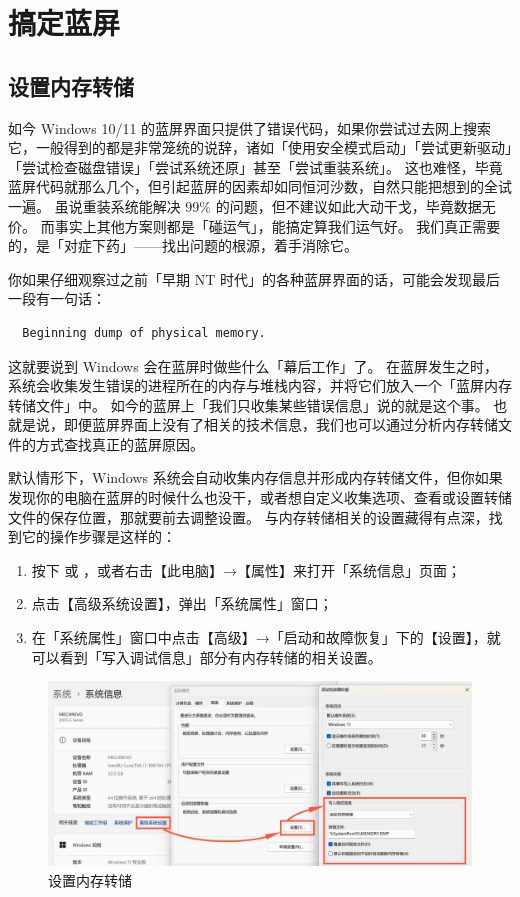 \section{搞定蓝屏}

\subsection{设置内存转储}

如今 Windows 10/11 的蓝屏界面只提供了错误代码，如果你尝试过去网上搜索它，一般得到的都是非常笼统的说辞，诸如「使用安全模式启动」「尝试更新驱动」「尝试检查磁盘错误」「尝试系统还原」甚至「尝试重装系统」。
这也难怪，毕竟蓝屏代码就那么几个，但引起蓝屏的因素却如同恒河沙数，自然只能把想到的全试一遍。
虽说重装系统能解决 99\% 的问题，但不建议如此大动干戈，毕竟数据无价。
而事实上其他方案则都是「碰运气」，能搞定算我们运气好。
我们真正需要的，是「对症下药」——找出问题的根源，着手消除它。

你如果仔细观察过之前「早期 NT 时代」的各种蓝屏界面的话，可能会发现最后一段有一句话：

\begin{Verbatim}
  Beginning dump of physical memory.
\end{Verbatim}

这就要说到 Windows 会在蓝屏时做些什么「幕后工作」了。
在蓝屏发生之时，系统会收集发生错误的进程所在的内存与堆栈内容，并将它们放入一个「蓝屏内存转储文件」中。
如今的蓝屏上「我们只收集某些错误信息」说的就是这个事。
也就是说，即便蓝屏界面上没有了相关的技术信息，我们也可以通过分析内存转储文件的方式查找真正的蓝屏原因。

默认情形下，Windows 系统会自动收集内存信息并形成内存转储文件，但你如果发现你的电脑在蓝屏的时候什么也没干，或者想自定义收集选项、查看或设置转储文件的保存位置，那就要前去调整设置。
与内存转储相关的设置藏得有点深，找到它的操作步骤是这样的：

\begin{enumerate}
  \item 按下  或 ，或者右击【此电脑】→【属性】来打开「系统信息」页面；
  \item 点击【高级系统设置】，弹出「系统属性」窗口；
  \item 在「系统属性」窗口中点击【高级】→「启动和故障恢复」下的【设置】，就可以看到「写入调试信息」部分有内存转储的相关设置。
\end{enumerate}

\begin{figure}[htb!]
  \centering
  \includegraphics[width=.8\textwidth]{assets/Dump_Settings.jpg}
  \caption{设置内存转储}
  \label{Dump_Settings}
\end{figure}

